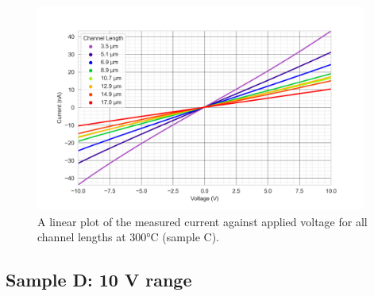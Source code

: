 \begin{figure}[h]
    \centering
    \includegraphics[width=0.97\textwidth]{Chapter3/Figs/Raster/Sample C 2019/IV/10V IV characteristics at 300 C.png}
    \caption{A linear plot of the measured current against applied voltage for all channel lengths at 300\si{\degreeCelsius} (sample C).}
    \label{appfig:C_current_voltage_300}
\end{figure}

\subsection{Sample D: 10 \si{\volt} range}

